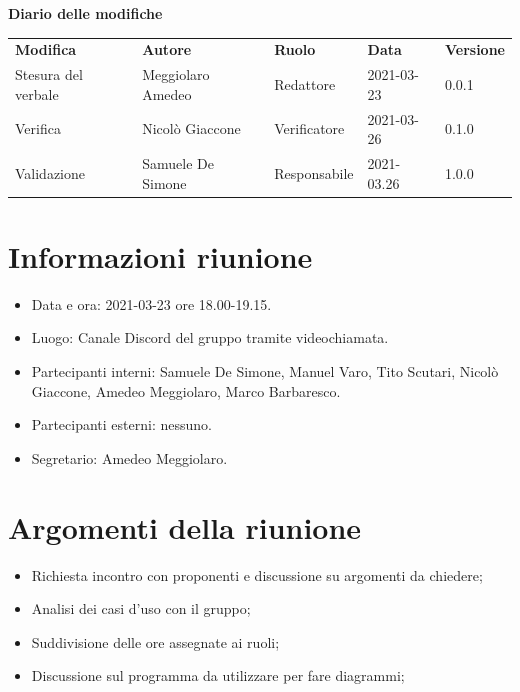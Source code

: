 \documentclass[a4paper]{article}
\begin{document}
        \begin{center}
            \textbf{\Large Diario delle modifiche}\\
            \vspace{10px}
            \begin{table}[h!]
            \centering
            \renewcommand{\arraystretch}{1.8}
            \begin{tabular}{p{150px} p{90px} p{70px} p{60px} p{45px}}
                \rowcolor{logo!70} \textbf{Modifica} & \textbf{Autore} & \textbf{Ruolo} & \textbf{Data} & \textbf{Versione}\\
                Stesura del verbale & Meggiolaro Amedeo & Redattore & 2021-03-23 & 0.0.1\\   
                Verifica & Nicolò Giaccone & Verificatore & 2021-03-26 & 0.1.0\\
                Validazione & Samuele De Simone & Responsabile & 2021-03.26 & 1.0.0\\
            \end{tabular}
        \end{table}
        \end{center}
    
        \newpage
        \tableofcontents
        \newpage

    \section{Informazioni riunione}
    \begin{itemize}
        \item Data e ora: 2021-03-23 ore 18.00-19.15.
        \item Luogo: Canale Discord del gruppo tramite videochiamata.
        \item Partecipanti interni: Samuele De Simone, Manuel Varo, Tito Scutari, Nicolò Giaccone, Amedeo Meggiolaro, Marco Barbaresco.
        \item Partecipanti esterni: nessuno.
        \item Segretario: Amedeo Meggiolaro.
    \end{itemize}
    \section{Argomenti della riunione}
    \begin{itemize}
        \item Richiesta incontro con proponenti e discussione su argomenti da chiedere;
        \item Analisi dei casi d'uso con il gruppo;
        \item Suddivisione delle ore assegnate ai ruoli;
        \item Discussione sul programma da utilizzare per fare diagrammi;
    \end{itemize}
\end{document}
